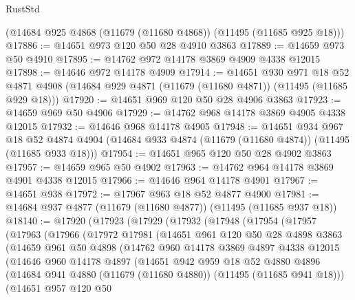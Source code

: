 \begin{lexlean}{RustStd}
\begin{coremodule}
    (@14684 @925 @4868 (@11679 (@11680 @4868)) (@11495 (@11685 @925 @18)))
@17886 := @14651 @973 @120 @50 @28 @4910 @3863
@17889 := @14659 @973 @50 @4910
@17895 := @14762 @972 @14178 @3869 @4909 @4338 @12015
@17898 := @14646 @972 @14178 @4909
@17914 := @14651
    @930
    @971
    @18
    @52
    @4871
    @4908
    (@14684 @929 @4871 (@11679 (@11680 @4871)) (@11495 (@11685 @929 @18)))
@17920 := @14651 @969 @120 @50 @28 @4906 @3863
@17923 := @14659 @969 @50 @4906
@17929 := @14762 @968 @14178 @3869 @4905 @4338 @12015
@17932 := @14646 @968 @14178 @4905
@17948 := @14651
    @934
    @967
    @18
    @52
    @4874
    @4904
    (@14684 @933 @4874 (@11679 (@11680 @4874)) (@11495 (@11685 @933 @18)))
@17954 := @14651 @965 @120 @50 @28 @4902 @3863
@17957 := @14659 @965 @50 @4902
@17963 := @14762 @964 @14178 @3869 @4901 @4338 @12015
@17966 := @14646 @964 @14178 @4901
@17967 := @14651 @938
@17972 := @17967 @963 @18 @52 @4877 @4900
@17981 := @14684 @937 @4877 (@11679 (@11680 @4877)) (@11495 (@11685 @937 @18))
@18140 := @17920
    (@17923
      (@17929
        (@17932
          (@17948
            (@17954
              (@17957
                (@17963
                  (@17966
                    (@17972
                      @17981
                      (@14651
                        @961
                        @120
                        @50
                        @28
                        @4898
                        @3863
                        (@14659
                          @961
                          @50
                          @4898
                          (@14762
                            @960
                            @14178
                            @3869
                            @4897
                            @4338
                            @12015
                            (@14646
                              @960
                              @14178
                              @4897
                              (@14651
                                @942
                                @959
                                @18
                                @52
                                @4880
                                @4896
                                (@14684
                                  @941
                                  @4880
                                  (@11679 (@11680 @4880))
                                  (@11495 (@11685 @941 @18)))
                                (@14651
                                  @957
                                  @120
                                  @50

\end{coremodule}
\end{lexlean}
